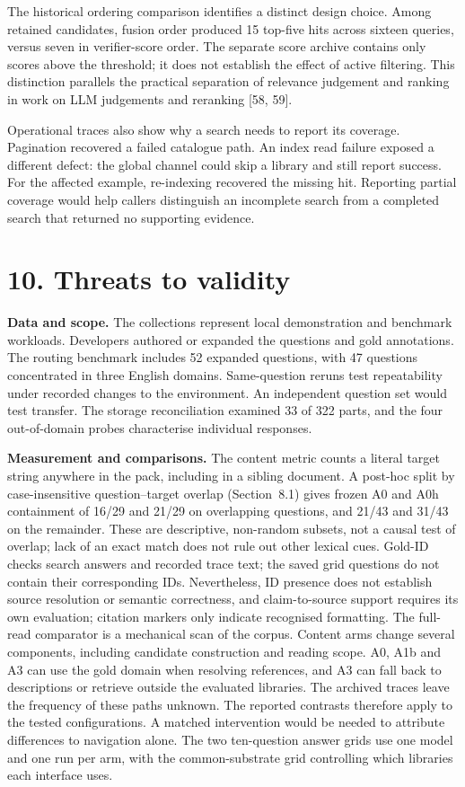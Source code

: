 The historical ordering comparison identifies a distinct design choice.
Among retained candidates, fusion order produced 15 top-five hits across
sixteen queries, versus seven in verifier-score order. The separate score
archive contains only scores above the threshold; it does not establish the
effect of active filtering. This distinction parallels the practical
separation of relevance judgement and ranking in work on
LLM judgements and reranking [58, 59].

Operational traces also show why a search needs to report its coverage.
Pagination recovered a failed catalogue path. An index read failure exposed
a different defect: the global channel could skip a library and still report
success. For the affected example, re-indexing recovered the missing hit.
Reporting partial coverage would help callers distinguish an incomplete search
from a completed search that returned no supporting evidence.


\section{10. Threats to validity}


\noindent\textbf{Data and scope.} The collections represent local
demonstration and benchmark workloads. Developers authored or expanded the
questions and gold annotations. The routing benchmark includes 52 expanded
questions, with 47 questions concentrated in three English domains.
Same-question reruns test repeatability under recorded changes to the
environment. An independent question set would test transfer. The storage
reconciliation examined 33 of 322 parts, and the four out-of-domain probes
characterise individual responses.

\noindent\textbf{Measurement and comparisons.} The content metric counts a
literal target string anywhere in the pack, including in a sibling
document. A post-hoc split by case-insensitive question--target overlap
(Section~8.1) gives frozen A0 and A0h containment of
16/29 and 21/29 on overlapping questions, and 21/43 and 31/43 on the
remainder. These are descriptive, non-random subsets, not a causal test of
overlap; lack of an exact match does not rule out other lexical cues.
Gold-ID checks search answers and recorded trace text; the saved grid
questions do not contain their corresponding IDs. Nevertheless, ID presence
does not establish source resolution or semantic correctness, and
claim-to-source support requires its own evaluation; citation markers only
indicate recognised formatting. The full-read comparator is a mechanical
scan of the corpus. Content arms change several components, including candidate
construction and reading scope. A0, A1b and A3 can use the gold domain when
resolving references, and A3 can fall back to descriptions or retrieve
outside the evaluated libraries. The archived traces leave the frequency of
these paths unknown. The reported contrasts therefore apply to the tested
configurations. A matched intervention would be needed to attribute
differences to navigation alone. The two ten-question answer grids use one
model and one run per arm, with the common-substrate grid controlling which
libraries each interface uses.

